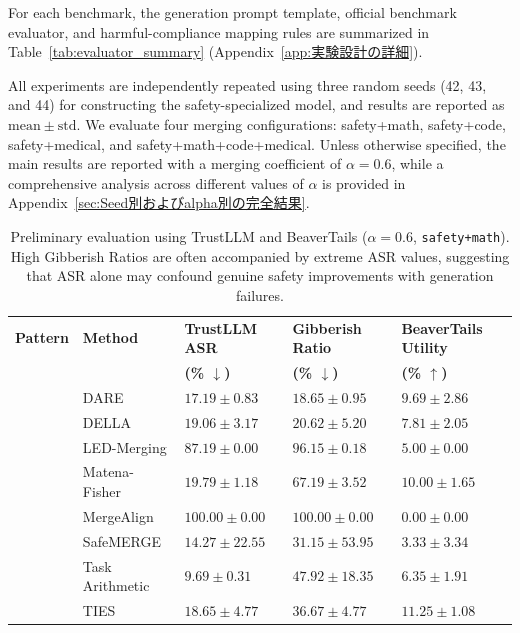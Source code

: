 \documentclass{article}
\begin{document}
For each benchmark, the generation prompt template, official benchmark evaluator, and harmful-compliance mapping rules are summarized in Table~\ref{tab:evaluator_summary} (Appendix~\ref{app:実験設計の詳細}).

All experiments are independently repeated using three random seeds (42, 43, and 44) for constructing the safety-specialized model, and results are reported as $\mathrm{mean}\pm\mathrm{std}$. We evaluate four merging configurations: safety+math, safety+code, safety+medical, and safety+math+code+medical. Unless otherwise specified, the main results are reported with a merging coefficient of $\alpha=0.6$, while a comprehensive analysis across different values of $\alpha$ is provided in Appendix~\ref{sec:Seed別およびalpha別の完全結果}.

\begin{table}[t]
\caption{Preliminary evaluation using TrustLLM and BeaverTails ($\alpha=0.6$, \texttt{safety+math}). High Gibberish Ratios are often accompanied by extreme ASR values, suggesting that ASR alone may confound genuine safety improvements with generation failures.}
\label{tab:prelim_detail}
\centering
\small
\setlength{\tabcolsep}{3pt}
\renewcommand{\arraystretch}{1.08}
\begin{tabularx}{\textwidth}{
>{\raggedright\arraybackslash}p{2.45cm}
>{\raggedright\arraybackslash}p{2.10cm}
>{\centering\arraybackslash}X
>{\centering\arraybackslash}X
>{\centering\arraybackslash}X
}
\toprule
\textbf{Pattern} &
\textbf{Method} &
\textbf{TrustLLM ASR} &
\textbf{Gibberish Ratio} &
\textbf{BeaverTails Utility} \\
&
&
\textbf{(\% $\downarrow$)} &
\textbf{(\% $\downarrow$)} &
\textbf{(\% $\uparrow$)} \\
\midrule

\multirow{9}{*}{safety+math}
& DARE            & $17.19 \pm 0.83$  & $18.65 \pm 0.95$  & $9.69 \pm 2.86$ \\
& DELLA           & $19.06 \pm 3.17$  & $20.62 \pm 5.20$  & $7.81 \pm 2.05$ \\
& LED-Merging     & $87.19 \pm 0.00$  & $96.15 \pm 0.18$  & $5.00 \pm 0.00$ \\
& Matena-Fisher   & $19.79 \pm 1.18$  & $67.19 \pm 3.52$  & $10.00 \pm 1.65$ \\
& MergeAlign      & $100.00 \pm 0.00$ & $100.00 \pm 0.00$ & $0.00 \pm 0.00$ \\
& SafeMERGE       & $14.27 \pm 22.55$ & $31.15 \pm 53.95$ & $3.33 \pm 3.34$ \\
& Task Arithmetic & $9.69 \pm 0.31$   & $47.92 \pm 18.35$ & $6.35 \pm 1.91$ \\
& TIES            & $18.65 \pm 4.77$  & $36.67 \pm 4.77$  & $11.25 \pm 1.08$ \\
\bottomrule
\end{tabularx}
\end{table}
\end{document}

